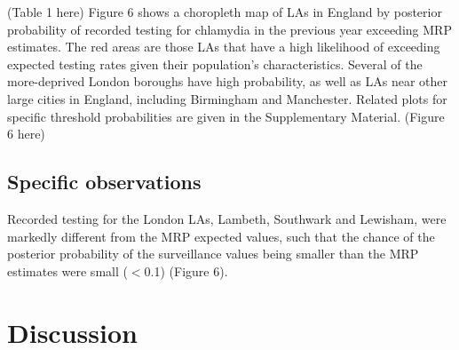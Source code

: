 \documentclass[12pt]{article}
\begin{document}
 (Table 1 here)
Figure 6 shows a choropleth map of LAs in England by posterior probability of recorded testing for chlamydia in the previous year exceeding MRP estimates. The red areas are those LAs that have a high likelihood of exceeding expected testing rates given their population’s characteristics. Several of the more-deprived London boroughs have high probability, as well as LAs near other large cities in England, including Birmingham and Manchester. Related plots for specific threshold probabilities are given in the Supplementary Material.
(Figure 6 here)

\subsection*{Specific observations}
Recorded testing for the London LAs, Lambeth, Southwark and Lewisham, were markedly different from the MRP expected values, such that the chance of the posterior probability of the surveillance values being smaller than the MRP estimates were small ($<$0.1) (Figure 6).

\section*{Discussion}
\end{document}
